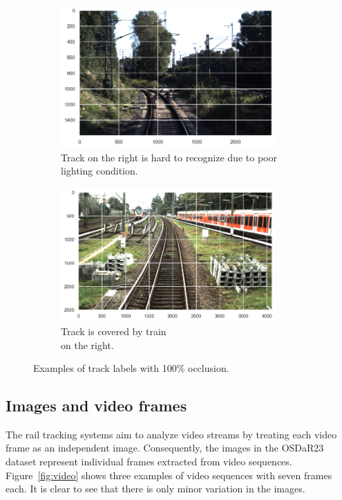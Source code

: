 \documentclass[Master,MDS,english]{BASE/twbook} %
\begin{document}
\begin{figure}
\centering
\begin{subfigure}{.5\textwidth}
  \centering
  \includegraphics[width=0.9\textwidth]{images/datasets/db/occlusion_example1}
  \caption{Track on the right is hard to recognize due to poor lighting condition.}
\end{subfigure}%
\begin{subfigure}{.5\textwidth}
  \centering
  \includegraphics[width=0.9\textwidth]{images/datasets/db/occlusion_example2}
  \caption{Track is covered by train \\ on the right. }
\end{subfigure}
\caption{Examples of track labels with 100\% occlusion.}
\label{fig:occlusion_examples}
\end{figure}


\subsection{Images and video frames}

The rail tracking systems aim to analyze video streams by treating each video frame as an independent image. Consequently, the images in the OSDaR23 dataset represent individual frames extracted from video sequences. 	Figure~\ref{fig:video} shows three examples of video sequences with seven frames each. It is clear to see that there is only minor variation in the images.
\end{document}
